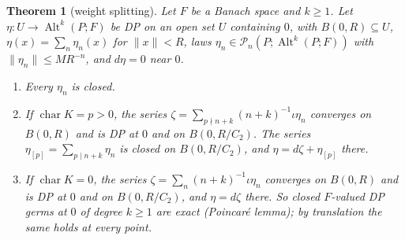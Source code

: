 \documentclass[11pt]{amsart}
\newtheorem{theorem}{Theorem}[section]
\theoremstyle{definition}
\theoremstyle{remark}
\numberwithin{equation}{section}
\newcommand{\Alt}{\operatorname{Alt}}
\newcommand{\norm}[1]{\lVert #1\rVert}
\theoremstyle{plain}
\theoremstyle{definition}
\theoremstyle{plain}
\newcommand{\cP}{\mathcal P}
\begin{document}
\begin{theorem}[weight splitting]\label{dp:thm:weight-splitting}
Let $F$ be a Banach space and $k\ge1$. Let $\eta\colon U\to\Alt^k(P;F)$ be DP on an open set $U$ containing $0$, with $B(0,R)\subseteq U$, $\eta(x)=\sum_n\eta_n(x)$ for $\norm x<R$, laws $\eta_n\in\cP_n(P;\Alt^k(P;F))$ with $\norm{\eta_n}\le MR^{-n}$, and $d\eta=0$ near $0$.
\begin{enumerate}
\item Every $\eta_n$ is closed.
\item If $\operatorname{char}K=p>0$, the series $\zeta=\sum_{p\nmid n+k}(n+k)^{-1}\iota\eta_n$ converges on $B(0,R)$ and is DP at $0$ and on $B(0,R/C_2)$. The series $\eta_{[p]}=\sum_{p\mid n+k}\eta_n$ is closed on $B(0,R/C_2)$, and $\eta=d\zeta+\eta_{[p]}$ there.
\item If $\operatorname{char}K=0$, the series $\zeta=\sum_n(n+k)^{-1}\iota\eta_n$ converges on $B(0,R)$ and is DP at $0$ and on $B(0,R/C_2)$, and $\eta=d\zeta$ there. So closed $F$-valued DP germs at $0$ of degree $k\ge1$ are exact (Poincar\'e lemma); by translation the same holds at every point.
\end{enumerate}
\end{theorem}
\end{document}
